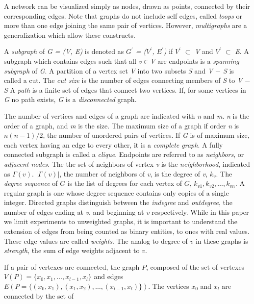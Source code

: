 A network can be visualized simply as nodes, drawn as points, connected by their corresponding edges. Note that graphs do not include self edges, called \textit{loops} or more than one edge joining the same pair of vertices. However, \textit{multigraphs} are a generalization which allow these constructs. 

A \textit{subgraph} of \textit{G = (V, E)} is denoted as \textit{$G^\prime$ = ($V^\prime$, $E^\prime$)} if \textit{$V^\prime$} $\subset$ \textit{V} and \textit{$V^\prime$} $\subset$ \textit{E}. A subgraph which contains edges such that all \textit{v}$\in$\textit{V} are endpoints is a \textit{spanning subgraph} of \textit{G}. 
A partition of a vertex set \textit{V} into two subsets \textit{S} and \textit{V $-$ S} is called a cut. The \textit{cut size} is the number of edges connecting members of \textit{S} to \textit{V $-$ S}
A \textit{path} is a finite set of edges that connect two vertices. If, for some vertices in \textit{G} no path exists, \textit{G} is a \textit{disconnected} graph.

The number of vertices and edges of a graph are indicated with \textit{n} and \textit{m}. \textit{n} is the order of a graph, and \textit{m} is the size. The maximum size of a graph if order \textit{n} is $n(n-1)/2$, the number of unordered pairs of vertices. If \textit{G} is of maximum size, each vertex having an edge to every other, it is a \textit{complete graph}. 
A fully connected subgraph is called a \textit{clique}. Endpoints are referred to as \textit{neighbors}, or \textit{adjacent nodes}. The the set of neighbors of vertex \textit{v} is the \textit{neighborhood}, indicated as \textit{$\Gamma(v)$}. $|\Gamma(v)|$, the number of neighbors of \textit{v}, is the degree of \textit{v}, $k_v$. The \textit{degree sequence} of $G$ is the list of degrees for each vertex of $G$, $k_{v1}, k_{v2},\dots, k_{vn}$. 
A regular graph is one whose degree sequence contains only copies of a single integer. Directed graphs distinguish between the \textit{indegree} and \textit{outdegree}, the number of edges ending at \textit{v}, and beginning at \textit{v} respectively. While in this paper we limit experiments to unweighted graphs, it is important to understand the extension of edges from being counted as binary entities, to ones with real values. These edge values are called \textit{weights}. The analog to degree of $v$ in these graphs is \textit{strength}, the sum of edge weights adjacent to $v$.


If a pair of vertexes are connected, the graph $P$, composed of the set of vertexes $V(P)=\{x_0, x_1,\dots, x_{l-1}, x_l\}$ and edges $E(P=\{(x_0,x_1), (x_1,x_2),\dots,(x_{l-1}, x_{l})\})$. The vertices $x_0$ and $x_l$ are connected by the set of %

